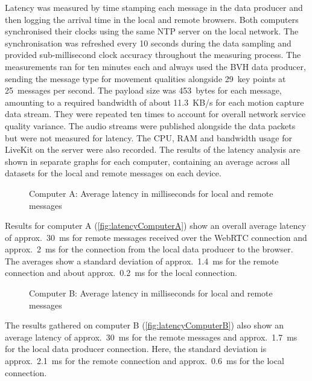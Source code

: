 Latency was measured by time stamping each message in the data producer and then logging the arrival time in the local and remote browsers.
Both computers synchronised their clocks using the same \ac{NTP} server on the local network.
The synchronisation was refreshed every 10 seconds during the data sampling and provided sub-millisecond clock accuracy throughout the measuring process.
The measurements ran for ten minutes each and always used the \ac{BVH} data producer, sending the message type for movement qualities alongside 29~key points at 25~messages per second.
The payload size was 453~bytes for each message, amounting to a required bandwidth of about 11.3~\ac{KB/s} for each motion capture data stream.
They were repeated ten times to account for overall network service quality variance.
The audio streams were published alongside the data packets but were not measured for latency.
The \ac{CPU}, \ac{RAM} and bandwidth usage for LiveKit on the server were also recorded.
The results of the latency analysis are shown in separate graphs for each computer, containing an average across all datasets for the local and remote messages on each device.

\begin{figure}[!h]
\centering

\caption[Message latency on Computer A]{Computer A: Average latency in milliseconds for local and remote messages\protect}
\label{fig:latencyComputerA}
\end{figure}

Results for computer A (\autoref{fig:latencyComputerA}) show an overall average latency of approx.~30~\ac{ms} for remote messages received over the \ac{WebRTC} connection and approx.~2~\ac{ms} for the connection from the local data producer to the browser.
The averages show a standard deviation of approx.~1.4~\ac{ms} for the remote connection and about approx.~0.2~\ac{ms} for the local connection.

\begin{figure}[!h]
\centering

\caption[Message latency on Computer B]{Computer B: Average latency in milliseconds for local and remote messages\protect}
\label{fig:latencyComputerB}
\end{figure}

The results gathered on computer B (\autoref{fig:latencyComputerB}) also show an average latency of approx.~30~\ac{ms} for the remote messages and approx.~1.7~\ac{ms} for the local data producer connection.
Here, the standard deviation is approx.~2.1~\ac{ms} for the remote connection and approx.~0.6~\ac{ms} for the local connection.

